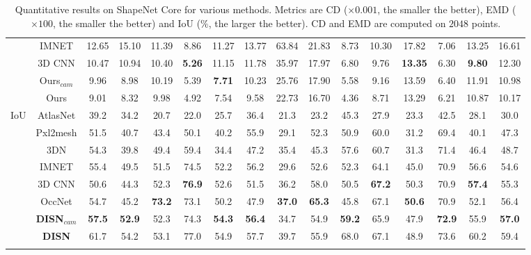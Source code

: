 \begin{table}[htb!]
\begin{tabular}{c|c|ccccccccccccc|c}
                     & IMNET     & 12.65 &    15.10 &    11.39 &    8.86  &    11.27 &    13.77   & 63.84 & 21.83   &    8.73  &    10.30 &    17.82 & 7.06     & 13.25 & 16.61       \\
                     & 3D CNN     & 10.47  & 10.94  & 10.40  & \textbf{5.26}  & 11.15  & 11.78  & 35.97  &  17.97 & 6.80 &  9.76  & \textbf{13.35}  & 6.30   &  \textbf{9.80}  & 12.30 \\
                     & Ours$_{cam}$&  9.96    & 8.98    & 10.19 &    5.39 & \textbf{7.71}   &    10.23 & 25.76 &     17.90 & 5.58 &    9.16 & 13.59 &    6.40 & 11.91 & 10.98  \\
                     & Ours& 9.01    & 8.32  & 9.98  &    4.92  &    7.54  &    9.58  &    22.73 &     16.70 & 4.36 & 8.71 & 13.29 &    6.21    & 10.87 & 10.17  \\\hline
\multirow{7}{*}{IoU} & AtlasNet   & 39.2  & 34.2  & 20.7  & 22.0  & 25.7  & 36.4    & 21.3  & 23.2    & 45.3  & 27.9  & 23.3  & 42.5  & 28.1  & 30.0  \\
                     & Pxl2mesh & 51.5  & 40.7  & 43.4  & 50.1  & 40.2  & 55.9    & 29.1  & 52.3    & 50.9  & 60.0  & 31.2  & 69.4  & 40.1  & 47.3  \\
                     & 3DN        & 54.3  & 39.8  & 49.4  & 59.4  & 34.4  & 47.2    & 35.4  & 45.3    & 57.6  & 60.7  & 31.3  & 71.4  & 46.4  & 48.7  \\
                     & IMNET     & 55.4 & 49.5 & 51.5 & 74.5 & 52.2 & 56.2 & 29.6 & 52.6 &    52.3 &    64.1 &    45.0 &    70.9     & 56.6 & 54.6      \\
                     & 3D CNN     & 50.6 & 44.3 &    52.3 &    \textbf{76.9} &    52.6 &    51.5 &    36.2 &    58.0 &    50.5 &    \textbf{67.2} &    50.3 &    70.9    & \textbf{57.4} & 55.3     \\
                     & OccNet     & 54.7 & 45.2 &    \textbf{73.2} &    73.1 &    50.2 &    47.9 &    \textbf{37.0} &    \textbf{65.3} &    45.8 &    67.1 &    \textbf{50.6} &    70.9    & 52.1 & 56.4     \\
                     & \textbf{DISN$_{cam}$}& \textbf{57.5} &    \textbf{52.9} &    52.3 &    74.3 &    \textbf{54.3} &    \textbf{56.4} &    34.7 &    54.9 &    \textbf{59.2} &    65.9 &    47.9 &    \textbf{72.9}    & 55.9 & \textbf{57.0}       \\
                     & \textbf{DISN} & 61.7 &    54.2 &    53.1 &    77.0 &    54.9 &    57.7 &    39.7 &    55.9 &    68.0 &    67.1 &    48.9 &    73.6    & 60.2 & 59.4      \\\hline
                \Xhline{2\arrayrulewidth}
\end{tabular}
\vspace{5pt}
\caption{Quantitative results on ShapeNet Core for various methods. Metrics are CD ($\times 0.001$, the smaller the better), EMD ($\times 100$, the smaller the better) and IoU ($\%$, the larger the better). CD and EMD are computed on $2048$ points.}
\label{tab:quant_main}
\vspace{-15pt}
\end{table}


